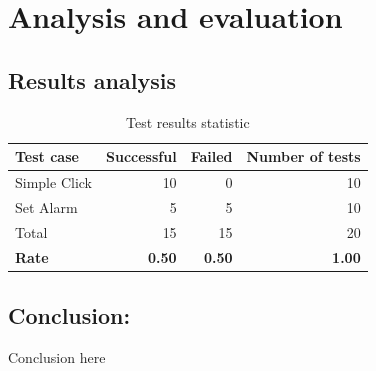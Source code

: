 \section{Analysis and evaluation}
\subsection{Results analysis}
\begin{table}[H]
	\centering
	\caption{Test results statistic}	
	\label{tab:result_stat}
	\begin{tabularx}{0.65\textwidth}{l|rrr}
		\hline
		Test case & Successful & Failed & Number of tests \\
		\hline
		Simple Click & 10 & 0 & 10 \\
		Set Alarm & 5 & 5 & 10 \\
		\hline
		Total & 15 & 15 & 20 \\
		\hline
		\textbf{Rate} & \textbf{0.50} & \textbf{0.50} & \textbf{1.00} \\
		\hline
	\end{tabularx}
\end{table}

\subsection{Conclusion:}
Conclusion here
